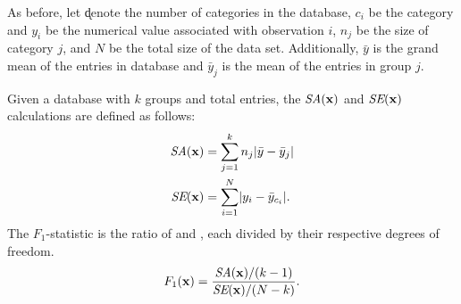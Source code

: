 
As before, let \k denote the number of categories in the database, $c_i$ be the category and $y_i$ be the numerical value associated with observation $i$, $n_j$ be the size of category $j$, and $N$ be the total size of the data set. Additionally, $\bar{y}$ is the grand mean of the entries in database \x and $\bar{y}_j$ is the mean of the entries in group $j$. 
\begin{definition}[$F_1$-statistic]\label{def:f1stat}
Given a database \x with $k$ groups and \dbsize total entries, the $\textit{SA}(\mathbf{x})$ and $\textit{SE}(\mathbf{x})$ calculations are defined as follows:
\begin{align*}
\textit{SA}(\mathbf{x})  &= \sum_{j = 1}^{k} n_{j} \lvert \bar{y} - \bar{y}_{j} \rvert \\
\textit{SE}(\mathbf{x}) &= \sum_{i=1}^N \lvert y_{i} - \bar{y}_{c_i} \rvert.
\end{align*}
The $F_1$-statistic is the ratio of \sa and \se, each divided by their respective degrees of freedom. 
\begin{equation*}
F_1(\mathbf{x}) = \frac{\textit{SA}(\mathbf{x})/(k-1)}{\textit{SE}(\mathbf{x})/(N-k)}.
\end{equation*}
\end{definition}

